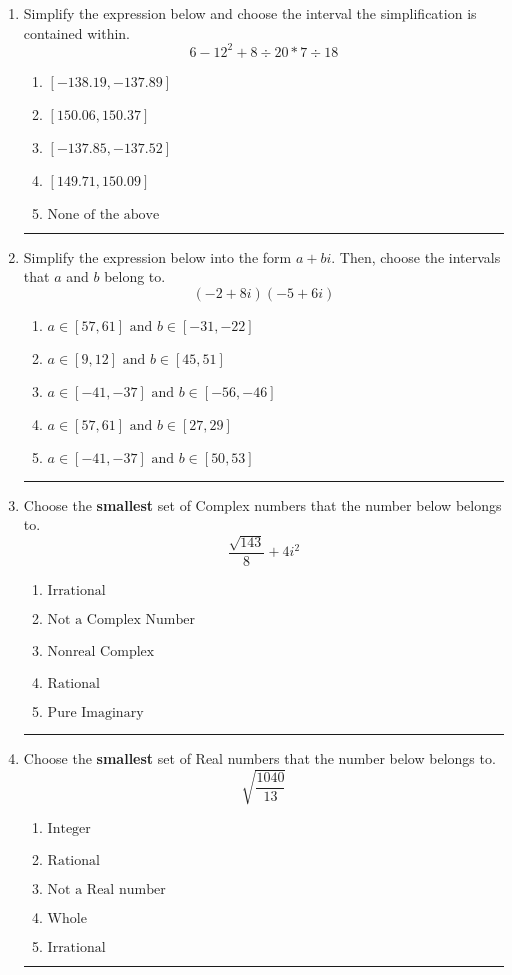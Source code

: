\documentclass[14pt]{extbook}
\newcommand{\litem}[1]{\item#1\hspace*{-1cm}\rule{\textwidth}{0.4pt}}
\begin{document}
\begin{enumerate}
{\begin{enumerate}[label=\Alph*.]
\end{enumerate} }
\litem{
Simplify the expression below and choose the interval the simplification is contained within.\[ 6 - 12^2 + 8 \div 20 * 7 \div 18 \]\begin{enumerate}[label=\Alph*.]
\item \( [-138.19, -137.89] \)
\item \( [150.06, 150.37] \)
\item \( [-137.85, -137.52] \)
\item \( [149.71, 150.09] \)
\item \( \text{None of the above} \)

\end{enumerate} }
\litem{
Simplify the expression below into the form $a+bi$. Then, choose the intervals that $a$ and $b$ belong to.\[ (-2 + 8 i)(-5 + 6 i) \]\begin{enumerate}[label=\Alph*.]
\item \( a \in [57, 61] \text{ and } b \in [-31, -22] \)
\item \( a \in [9, 12] \text{ and } b \in [45, 51] \)
\item \( a \in [-41, -37] \text{ and } b \in [-56, -46] \)
\item \( a \in [57, 61] \text{ and } b \in [27, 29] \)
\item \( a \in [-41, -37] \text{ and } b \in [50, 53] \)

\end{enumerate} }
\litem{
Choose the \textbf{smallest} set of Complex numbers that the number below belongs to.\[ \frac{\sqrt{143}}{8}+4i^2 \]\begin{enumerate}[label=\Alph*.]
\item \( \text{Irrational} \)
\item \( \text{Not a Complex Number} \)
\item \( \text{Nonreal Complex} \)
\item \( \text{Rational} \)
\item \( \text{Pure Imaginary} \)

\end{enumerate} }
\litem{
Choose the \textbf{smallest} set of Real numbers that the number below belongs to.\[ \sqrt{\frac{1040}{13}} \]\begin{enumerate}[label=\Alph*.]
\item \( \text{Integer} \)
\item \( \text{Rational} \)
\item \( \text{Not a Real number} \)
\item \( \text{Whole} \)
\item \( \text{Irrational} \)


\end{enumerate}}
\end{enumerate}
\end{document}
